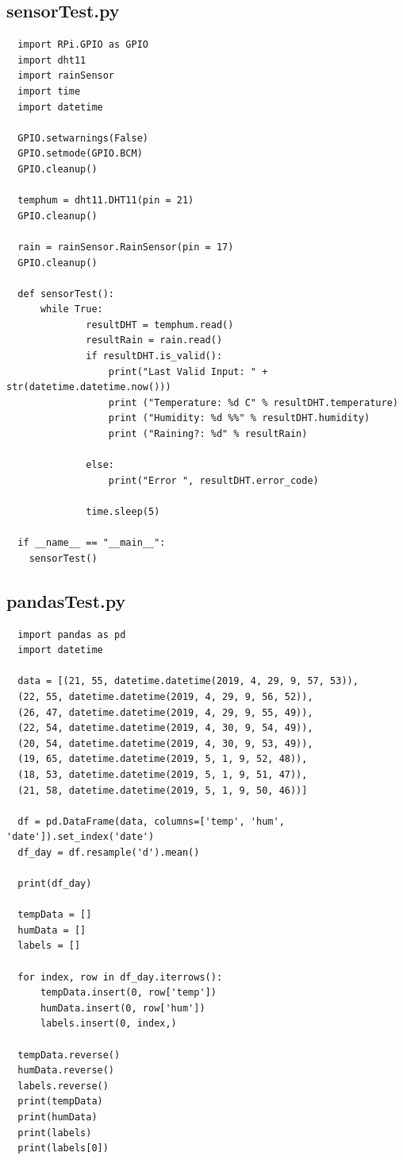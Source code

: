 \documentclass[10pt,a4paper]{article}
\begin{document}
\subsection{sensorTest.py}
\begin{verbatim}
  import RPi.GPIO as GPIO
  import dht11
  import rainSensor
  import time
  import datetime

  GPIO.setwarnings(False)
  GPIO.setmode(GPIO.BCM)
  GPIO.cleanup()

  temphum = dht11.DHT11(pin = 21)
  GPIO.cleanup()

  rain = rainSensor.RainSensor(pin = 17)
  GPIO.cleanup()

  def sensorTest():
      while True:
              resultDHT = temphum.read()
              resultRain = rain.read()
              if resultDHT.is_valid():
                  print("Last Valid Input: " + str(datetime.datetime.now()))
                  print ("Temperature: %d C" % resultDHT.temperature)
                  print ("Humidity: %d %%" % resultDHT.humidity)
                  print ("Raining?: %d" % resultRain)

              else:
                  print("Error ", resultDHT.error_code)
              
              time.sleep(5)
                  
  if __name__ == "__main__":
    sensorTest()
\end{verbatim}

\subsection{pandasTest.py}
\begin{verbatim}
  import pandas as pd
  import datetime

  data = [(21, 55, datetime.datetime(2019, 4, 29, 9, 57, 53)), 
  (22, 55, datetime.datetime(2019, 4, 29, 9, 56, 52)), 
  (26, 47, datetime.datetime(2019, 4, 29, 9, 55, 49)), 
  (22, 54, datetime.datetime(2019, 4, 30, 9, 54, 49)), 
  (20, 54, datetime.datetime(2019, 4, 30, 9, 53, 49)), 
  (19, 65, datetime.datetime(2019, 5, 1, 9, 52, 48)), 
  (18, 53, datetime.datetime(2019, 5, 1, 9, 51, 47)), 
  (21, 58, datetime.datetime(2019, 5, 1, 9, 50, 46))]

  df = pd.DataFrame(data, columns=['temp', 'hum', 'date']).set_index('date')
  df_day = df.resample('d').mean()

  print(df_day)

  tempData = []
  humData = []
  labels = []

  for index, row in df_day.iterrows():
      tempData.insert(0, row['temp'])
      humData.insert(0, row['hum'])
      labels.insert(0, index,)

  tempData.reverse()
  humData.reverse()
  labels.reverse()
  print(tempData)
  print(humData)
  print(labels)
  print(labels[0])
\end{verbatim}
\end{document}
